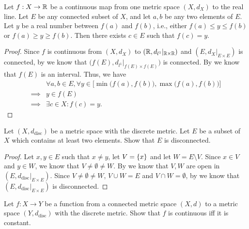\begin{cor}\label{ii:2.4.7}
  Let \(f : X \to \mathbb{R}\) be a continuous map from one metric space \((X, d_X)\) to the real line.
  Let \(E\) be any connected subset of \(X\), and let \(a, b\) be any two elements of \(E\).
  Let \(y\) be a real number between \(f(a)\) and \(f(b)\), i.e., either \(f(a) \leq y \leq f(b)\) or \(f(a) \geq y \geq f(b)\).
  Then there exists \(c \in E\) such that \(f(c) = y\).
\end{cor}

\begin{proof}
  Since \(f\) is continuous from \((X, d_X)\) to \((\mathbb{R}, d_{l^1}|_{\mathbb{R} \times \mathbb{R}})\) and \((E, d_X|_{E \times E})\) is connected, by  we know that \(\big(f(E), d_{l^1}|_{f(E) \times f(E)}\big)\) is connected.
  By  we know that \(f(E)\) is an interval.
  Thus, we have
  \begin{align*}
             & \forall a, b \in E, \forall y \in \Big[\min\big(f(a), f(b)\big), \max\big(f(a), f(b)\big)\Big] \\
    \implies & y \in f(E)                                                                                     \\
    \implies & \exists c \in X : f(c) = y.
  \end{align*}
\end{proof}

\exercisesection

\begin{ex}\label{ii:ex:2.4.1}
  Let \((X, d_{\text{disc}})\) be a metric space with the discrete metric.
  Let \(E\) be a subset of \(X\) which contains at least two elements.
  Show that \(E\) is disconnected.
\end{ex}

\begin{proof}
  Let \(x, y \in E\) such that \(x \neq y\), let \(V = \left\lbrace x\right\rbrace\) and let \(W = E \setminus V\).
  Since \(x \in V\) and \(y \in W\), we know that \(V \neq \emptyset \neq W\).
  By  we know that \(V, W\) are open in \((E, d_{\text{disc}}|_{E \times E})\).
  Since \(V \neq \emptyset \neq W\), \(V \cup W = E\) and \(V \cap W = \emptyset\), by  we know that \((E, d_{\text{disc}}|_{E \times E})\) is disconnected.
\end{proof}

\begin{ex}\label{ii:ex:2.4.2}
  Let \(f : X \to Y\) be a function from a connected metric space \((X, d)\) to a metric space \((Y, d_{\text{disc}})\) with the discrete metric.
  Show that \(f\) is continuous iff it is constant.
\end{ex}


